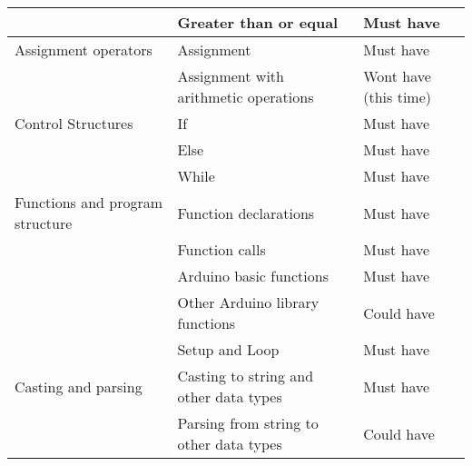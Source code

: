 \begin{table}[H]
\begin{tabular}{@{}lll@{}}
                       & Greater than or equal   & Must have                       \\ \midrule
Assignment operators   & Assignment              & Must have                       \\
                       & Assignment with 
                         arithmetic operations   & Wont have (this time)          \\ \midrule
Control Structures     & If                      & Must have                       \\
                       & Else                    & Must have                       \\
                       & While                   & Must have                       \\\midrule
Functions and program structure     & Function declarations             & Must have \\
                                    & Function calls                    & Must have \\ 
                                    & Arduino basic functions           & Must have \\ 
                                    & Other Arduino library functions   & Could have \\
                                    & Setup and Loop                    & Must have \\ \midrule
Casting and parsing                 & Casting to string and other data types         & Must have \\
                                    & Parsing from string to other data types        & Could have \\ \midrule
                       
\end{tabular}
\end{table}
